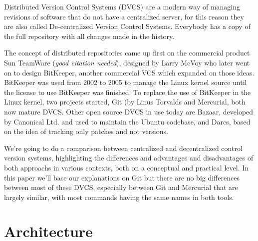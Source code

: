 \documentclass[%
	final,
	notitlepage,
	narroweqnarray,
	inline,
	twoside,
	]{ieee}
\begin{document}
Distributed Version Control Systems (DVCS) are a modern way of managing
revisions of software that do not have a centralized server, for this reason 
they are also called De-centralized Version Control Systems. Everybody has a 
copy of the full repository with all changes made in the history.

The concept of distributed repositories came up first on the commercial product 
Sun TeamWare (\emph{good citation needed}), designed by Larry McVoy who later went 
on to design BitKeeper, another commercial VCS which expanded on those ideas. 
BitKeeper was used from 2002 to 2005 to manage the Linux kernel source until 
the license to use BitKeeper was finished. 
To replace the use of BitKeeper in the Linux kernel, two projects started, Git (by
Linus Torvalds \cite{linusgit} and 
Mercurial, both now mature DVCS. Other open source DVCS in use today are Bazaar, 
developed by Canonical Ltd. and used to maintain the Ubuntu codebase, and Darcs, based on 
the idea of tracking only patches and not versions.


We're going to do a comparison between centralized and decentralized control version systems,
highlighting the differences and advantages and disadvantages of both approachs in various 
contexts, both on a conceptual and practical level. In this paper we'll base our explanations 
on Git but there are no big differences between 
most of these DVCS, especially between Git and Mercurial that are largely similar, with 
most commands having the same names in both tools.




\section{Architecture}
\end{document}
